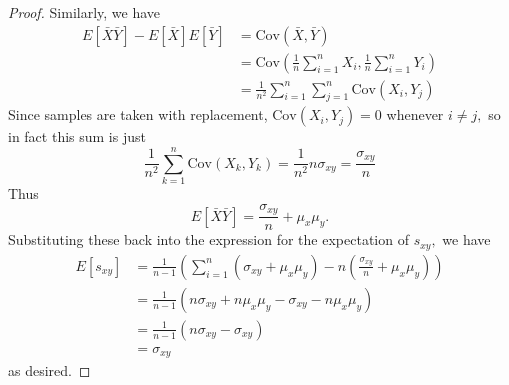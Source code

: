 \documentclass{article}
\newcommand{\cov}{\mathrm{Cov}}
\begin{document}
\begin{enumerate}
\begin{proof}
			Similarly, we have 
			\begin{align*}
				E[\bar{X}\bar{Y}]-E[\bar{X}]E[\bar{Y}]&=\cov(\bar{X}, \bar{Y}) \\
				&= \cov\left( \frac{1}{n}\sum_{i=1}^{n} X_i, \frac{1}{n}\sum_{i=1}^{n}Y_i \right) \\
				&= \frac{1}{n^2} \sum_{i=1}^{n}\sum_{j=1}^{n}\cov(X_i, Y_j)
			\end{align*}
			Since samples are taken with replacement, $\cov(X_i, Y_j)=0$ whenever $i\neq j,$ so in fact this sum is just \[\frac{1}{n^2}\sum_{k=1}^{n}\cov(X_k, Y_k) = \frac{1}{n^2}n\sigma_{xy} = \frac{\sigma_{xy}}{n}\] Thus \[E[\bar{X}\bar{Y}]=\frac{\sigma_{xy}}{n}+\mu_x\mu_y.\] Substituting these back into the expression for the expectation of $s_{xy},$ we have 
			\begin{align*}
				E[s_{xy}] &= \frac{1}{n-1}\left( \sum_{i=1}^{n} (\sigma_{xy}+\mu_x\mu_y) - n\left( \frac{\sigma_{xy}}{n}+\mu_x\mu_y \right) \right) \\
				&= \frac{1}{n-1} \left( n\sigma_{xy}+n\mu_x\mu_y-\sigma_{xy}-n\mu_x\mu_y \right) \\
				&= \frac{1}{n-1}(n\sigma_{xy}-\sigma_{xy}) \\
				&= \sigma_{xy}
			\end{align*} as desired.
		\end{proof}

\end{enumerate}
\end{document}
